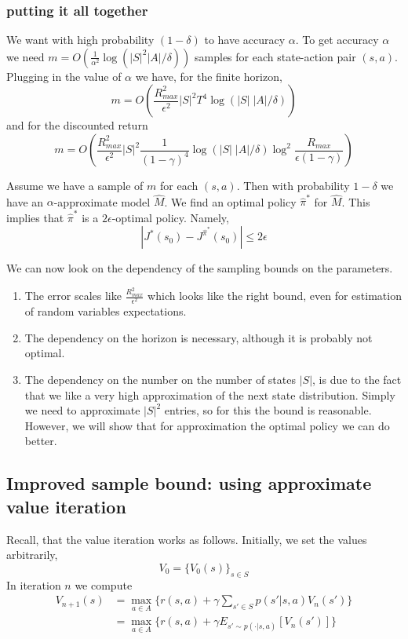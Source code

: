 \subsubsection{putting it all together}

We want with high probability $(1-\delta)$ to have accuracy
$\alpha$. To get accuracy $\alpha$ we need $m=O(\frac{1}{\alpha^2}
\log(|S|^2 |A|/\delta))$ samples for each state-action pair $(s,a)$.
Plugging in the value of $\alpha$ we have, for the finite horizon,
\[
m=O(\frac{R_{max}^2}{\epsilon^2} |S|^2 T^4 \log (|S|\;|A|/\delta))
\]
and for the discounted return
\[
m=O(\frac{R_{max}^2}{\epsilon^2} |S|^2 \frac{1}{(1-\gamma)^4} \log
(|S|\;|A|/\delta)\log^2 \frac{R_{max}}{\epsilon(1-\gamma)})
\]

Assume we have a sample of $m$ for each $(s,a)$. Then with
probability $1-\delta$ we have an $\alpha$-approximate model
$\widehat{M}$.
%
We find an optimal policy $\widehat{\pi}^*$ for $\widehat{M}$.
%
This implies that $\widehat{\pi}^*$ is a $2\epsilon$-optimal policy.
Namely,
\[
|J^*(s_0)-J^{\widehat{\pi}^*}(s_0)|\leq 2\epsilon
\]

We can now look on the dependency of the sampling bounds on the
parameters.

\begin{enumerate}
\item
The error scales like $\frac{R^2_{max}}{\epsilon^2}$ which looks
like the right bound, even for estimation of random variables
expectations.
\item
The dependency on the horizon is necessary, although it is probably
not optimal.
\item
The dependency on the number on the number of states $|S|$, is due
to the fact that we like a very high approximation of the next state
distribution. Simply we need to approximate $|S|^2$ entries, so for
this the bound is reasonable. However, we will show that for
approximation the optimal policy we can do better.
\end{enumerate}

\subsection{Improved sample bound: using approximate value
iteration}

Recall, that the value iteration works as follows. Initially, we set
the values arbitrarily,
\[
V_0=\{V_0(s)\}_{s\in S}
\]
In iteration $n$ we compute
\begin{align*}
V_{n+1}(s)&=\max_{a\in A} \{ r(s,a)+\gamma \sum_{s'\in S} p(s'|s,a)
V_n(s')\}\\
&=\max_{a\in A} \{ r(s,a)+\gamma E_{s'\sim p(\cdot |s,a)}
[V_n(s')]\}
\end{align*}


